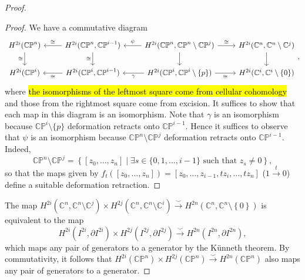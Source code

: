 \documentclass[10pt,letterpaper,cm]{nupset}
\theoremstyle{definition}
\theoremstyle{theorem}
\theoremstyle{remark}
\newcommand{\C}{\mathbb C}
\newcommand{\CP}{\mathbb{CP}}
\newcommand{\1}{\mathbb{1}}
\newcommand{\0}{\vec 0}
\begin{document}
\begin{proof}
\begin{proof}
We have a commutative diagram 
\[
\begin{tikzcd}
H^{2i}(\CP^n) \arrow[d, "\cong"'] & {H^{2i}(\CP^n, \CP^{i-1})} \arrow[l, "\cong"'] \arrow[d, "\cong"'] & {H^{2i}(\CP^n, \CP^n \setminus \CP^j)} \arrow[l, "\psi"'] \arrow[r, "\cong"] \arrow[d] & {H^{2i}(\C^n, \C^n \setminus \C^j)} \arrow[d] \\
H^{2i}(\CP^i)                     & {H^{2i}(\CP^i, \CP^{i-1})} \arrow[l, "\cong"]                      & {H^{2i}(\CP^i, \CP^i \setminus \{p\})} \arrow[l, "\gamma"] \arrow[r, "\cong"']                             & {H^{2i}(\C^i, \C^i \setminus \left\{0\right\})}           
\end{tikzcd}
,\] where \hl{the isomorphisms of the leftmost square come from cellular cohomology} and those from the rightmost square come from excision. It suffices to show that each map in this diagram is an isomorphism. Note that $\gamma$ is an isomorphism because $\CP^i \setminus \{p\}$ deformation retracts onto $\CP^{i-1}$. Hence it suffices to observe that $\psi$ is an isomorphism because $\CP^n \setminus \CP^{j}$ deformation retracts onto $\CP^{i-1}$. Indeed, $$\CP^n \setminus \CP^{j}= \left\{[z_0, \ldots, z_n] \mid \exists s \in \{0,1, \ldots, i-1\} \text{ such that } z_s \ne 0\right\},$$ so that the maps given by $f_t([z_0, \ldots, z_n])  = [z_0, \ldots, z_{i-1}, tz_i, \ldots, tz_n]$ ($1 \overset{t}{\rightarrow} 0$) define a suitable deformation retraction. 
\end{proof}
The map $H^{2i}(\C^n, \C^n \setminus \C^j)\times H^{2j}(\C^n, \C^n \setminus \C^i) \overset{\smile}{\longrightarrow} H^{2n}(\C^n, \C^n \setminus \left\{0\right\})$ is equivalent to the map $$H^{2i}(I^{2i}, \partial{I^{2i}})\times H^{2j}(I^{2j}, \partial{I^{2j}}) \overset{\smile}{\longrightarrow} H^{2n}(I^{2n}, \partial{I^{2n}}),$$ which maps any pair of generators to a generator by the K\"unneth theorem. 
By commutativity, it follows that $ H^{2i}(\CP^n)\times H^{2j}(\CP^n) \overset{\smile}{\longrightarrow} H^{2n}(\CP^n) $ also maps any pair of generators to a generator.  
\end{proof}
\end{document}
